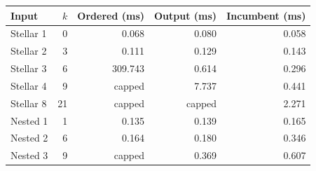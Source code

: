 \begin{center}
\begin{tabular}{@{}lrrrr@{}}
\toprule
Input & $k$ & Ordered (ms) & Output (ms) & Incumbent (ms) \\
\midrule
Stellar 1 & 0 & 0.068 & 0.080 & 0.058 \\
Stellar 2 & 3 & 0.111 & 0.129 & 0.143 \\
Stellar 3 & 6 & 309.743 & 0.614 & 0.296 \\
Stellar 4 & 9 & capped & 7.737 & 0.441 \\
Stellar 8 & 21 & capped & capped & 2.271 \\
Nested 1 & 1 & 0.135 & 0.139 & 0.165 \\
Nested 2 & 6 & 0.164 & 0.180 & 0.346 \\
Nested 3 & 9 & capped & 0.369 & 0.607 \\
\bottomrule
\end{tabular}
\end{center}
